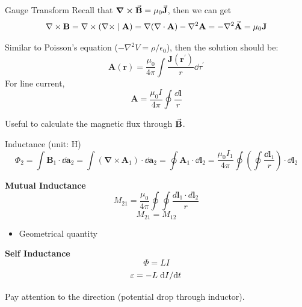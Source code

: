 \documentclass[9pt]{beamer}
\begin{document}
\begin{frame}{Gauge Transform}
    Recall that $\curl \va{B} = \mu_0 \va{J}$, then we can get 
    \begin{equation*}
        \nabla \times \mathbf{B}=\nabla \times(\nabla \times \mid \mathbf{A})=\nabla(\nabla \cdot \mathbf{A})-\nabla^{2} \mathbf{A} = -\nabla^2 \va{A} = \mu_{0} \mathbf{J}
    \end{equation*}

    Similar to Poisson's equation ($-\nabla^2 V = \rho/\epsilon_0$), then the solution should be:
    \begin{equation*}
        \mathbf{A}(\mathbf{r})=\frac{\mu_{0}}{4 \pi} \int \frac{\mathbf{J}\left(\mathbf{r}^{\prime}\right)}{r} \dd \tau^{\prime}
    \end{equation*}
    For line current,
    \begin{equation*}
        \mathbf{A}=\frac{\mu_{0} I}{4 \pi} \oint \frac{\dd \mathbf{l}}{r}
    \end{equation*}

    Useful to calculate the magnetic flux through $\va{B}$.
\end{frame}


\begin{frame}{Inductance (unit: H)}
    \begin{equation*}
        \Phi_{2}=\int \mathbf{B}_{1} \cdot \dd \mathbf{a}_{2}=\int\left(\mathbf{\nabla} \times \mathbf{A}_{1}\right) \cdot \dd \mathbf{a}_{2}=\oint \mathbf{A}_{1} \cdot \dd \mathbf{l}_{2} =\frac{\mu_{0} I_{1}}{4 \pi} \oint\left(\oint \frac{\dd \mathbf{l}_{1}}{r}\right) \cdot \dd \mathbf{l}_{2}
    \end{equation*}
    \begin{beamerboxesrounded}[shadow=true]{\bf Mutual Inductance}
        \begin{equation}
            M_{21}=\frac{\mu_{0}}{4 \pi} \oint \oint \frac{d \mathbf{l}_{1} \cdot d \mathbf{l}_{2}}{r}
        \end{equation}
        \begin{equation}
            M_{21} = M_{12} 
        \end{equation}

        \begin{itemize}
            \item Geometrical quantity
        \end{itemize}
    \end{beamerboxesrounded}

    \begin{beamerboxesrounded}[shadow=true]{\bf Self Inductance}
        \begin{equation}
            \Phi = L I
        \end{equation}
        \begin{equation}
            \varepsilon = - L \dv*{I}{t} 
        \end{equation}

        Pay attention to the direction (potential drop through inductor).
    \end{beamerboxesrounded}
\end{frame}
\end{document}
